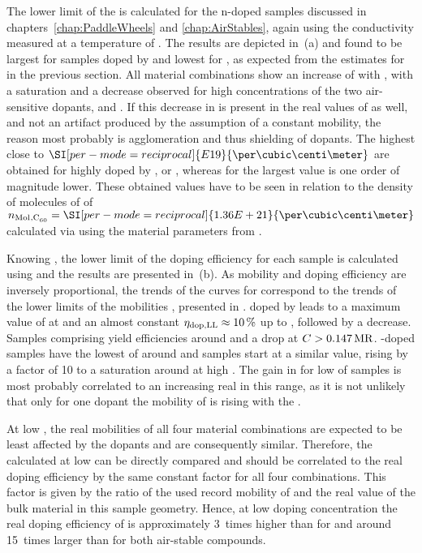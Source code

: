 The lower limit of the \nLong \neLL is calculated for the n-doped \CS samples discussed in chapters~\ref{chap:PaddleWheels} and \ref{chap:AirStables}, again using the conductivity measured at a temperature of \T[40]. The results are depicted in \,(a) and found to be largest for samples doped by \CrPd and lowest for \aob, as expected from the estimates for \mobLL in the previous section. All material combinations show an increase of \neLL with \CLong, with a saturation and a decrease observed for high concentrations of the two air-sensitive dopants, \CrPd and \WPd. If this decrease in \neLL is present in the real values of \ne as well, and not an artifact produced by the assumption of a constant mobility, the reason most probably is agglomeration and thus shielding of dopants. The highest \neLL close to $\SI[per-mode=reciprocal]{E19}{\per\cubic\centi\meter}$ are obtained for \CS highly doped by \dmbi, \CrPd or \WPd, whereas for \aob the largest value is one order of
magnitude lower. These obtained values have to be seen in relation to the density of molecules of \CS of \mbox{$\nM{}_{\text{,C}_{60}}=\SI[per-mode=reciprocal]{1.36E+21}{\per\cubic\centi\meter}$} calculated via  using the material parameters from .

Knowing \neLL, the lower limit of the doping efficiency \DopEffLL for each sample is calculated using  and the results are presented in \,(b). As mobility and doping efficiency are inversely proportional, the trends of the curves for \DopEffLL correspond to the trends of the lower limits of the mobilities \mobLL, presented in . \CS doped by \CrPd leads to a maximum value of \DopEffLL[18] at \C[0.005] and an almost constant \mbox{$\DopEffLL\approx10\,\%$} up to \C[0.045], followed by a decrease. Samples comprising \WPd yield efficiencies around \DopEffLL[3] and a drop at $\C>\mr{0.147}$.
\aob-doped samples have the lowest \DopEffLL of around \DopEffLL[0.2] and \dmbi samples start at a similar value, rising by a factor of 10 to a saturation around \DopEffLL[2] at high \CLongs. The gain in \DopEffLL for low \C of \dmbi samples is most probably correlated to an increasing real \DopEff in this range, as it is not unlikely that only for one dopant the mobility of \CS is rising with the \CLong.

At low \CLongs, the real mobilities of all four material combinations are expected to be least affected by the dopants and are consequently similar. Therefore, the calculated \DopEffLL at low \C can be directly compared and should be correlated to the real doping efficiency \DopEff by the same constant factor for all four combinations. This factor is given by the ratio of the used record mobility of \mob[5] and the real value of the bulk material in this sample geometry. Hence, at low doping concentration the real doping efficiency \DopEff of \CrPd is approximately 3~times higher than for \WPd and around 15~times larger than for both air-stable compounds.

